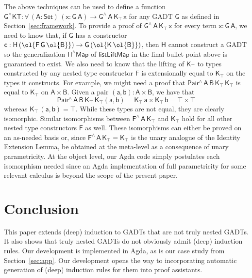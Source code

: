 \documentclass[sigplan,10pt]{acmart}
\begin{document}
The above techniques can be used to define a function
$\mathsf{G^\wedge KT : \forall\, (A : Set)\, (x : G\,A) \to
  G^{\wedge}\, A\, K_\top\, x}$ for any GADT $\mathsf{G}$ as defined
in Section~\ref{sec:framework}.  To provide a proof of
$\mathsf{G^{\wedge}\, A\, K_\top \, x}$ for every term $\mathsf{x :
  G\, A}$, we need to know that, if $\mathsf{G}$ has a constructor
$\mathsf{c : H \, (\ol{F\,G\, \ol{B}}) \to G\, (\ol{K\,\ol{B}})}$,
then $\mathsf{H}$ cannot construct a GADT so the generalization
$\mathsf{H^\wedge Map}$ of $\mathsf{listLiftMap}$ in the final bullet
point above is guaranteed to exist. We also need to know that the
lifting of $\mathsf{K_\top}$ to types constructed by any nested type
constructor $\mathsf{F}$ is extensionally equal to $\mathsf{K_\top}$
on the types it constructs. For example, we might need a proof that
$\mathsf{Pair^{\wedge}\,A\,B\,K_\top\,K_\top}$ is equal to
$\mathsf{K_\top}$ on $\mathsf{A \times B}$.  Given a pair $\mathsf{(a
  , b) : A \times B}$, we have that
\[\mathsf{Pair^{\wedge}\,A\,B\,K_\top\,K_\top (a, b) = K_\top \, a
  \times K_\top\, b = \top \times \top}\] whereas $\mathsf{K_\top\,
  (a, b) = \top}$. While these types are not equal, they are clearly
isomorphic. Similar isomorphisms between
$\mathsf{F^{\wedge}\,A\,K_\top}$ and $\mathsf{K_\top}$ hold for all
other nested type constructors $\mathsf{F}$ as well. These
isomorphisms can either be proved on an as-needed basis or, since
$\mathsf{F^\wedge\,A\,K_\top = K_\top}$ is the unary analogue of the
Identity Extension Lemma, be obtained at the meta-level as a
consequence of unary parametricity. At the object level, our Agda
code
simply postulates each isomorphism needed since
an Agda implementation of full parametricity for some relevant
calculus is beyond the scope of the present paper.

\section{Conclusion}\label{sec:conclusion}

This paper extends (deep) induction to GADTs that are not truly nested
GADTs. It also shows that truly nested GADTs do not obviously admit
(deep) induction rules. Our development is implemented in Agda, as is
our case study from Section~\ref{sec:app}. Our development opens the
way to incorporating automatic generation of (deep) induction rules
for them into proof assistants.



\end{document}

